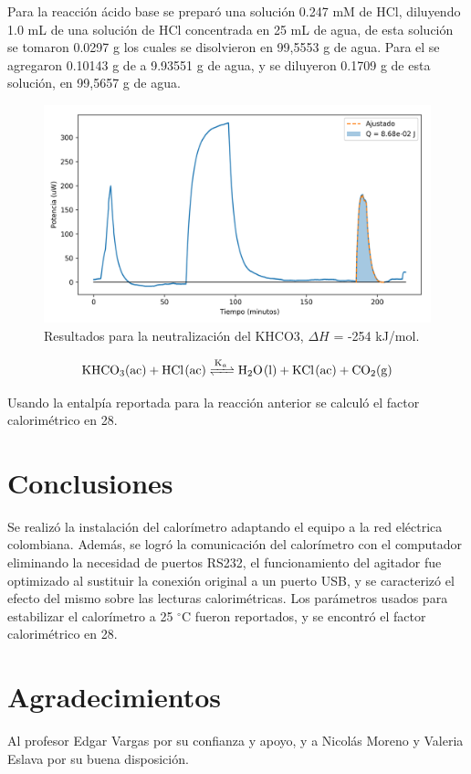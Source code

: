 \documentclass[a0]{sciposter}
\newcommand{\grad}{$^\circ$C}
\newcommand{\figwidth}{0.7\linewidth}
\begin{document}
\begin{multicols}{3}
	Para la reacci\'on \'acido base se prepar\'o una soluci\'on 0.247 mM de HCl, diluyendo 1.0 mL de una soluci\'on de HCl concentrada en 25 mL de agua, de esta soluci\'on se tomaron 0.0297 g los cuales se disolvieron en 99,5553 g de agua. Para el  se agregaron 0.10143 g de  a 9.93551 g de agua, y se diluyeron 0.1709 g de esta soluci\'on, en 99,5657 g de agua.

	\begin{figure}[h]
		\centering
		\includegraphics[width=\figwidth]{../Data/ChemicalCalibrations/HCl}
		\caption{Resultados para la neutralización del {KHCO3}, $\Delta H$ = -254 kJ/mol.}
	\end{figure}

	\begin{equation}
		\ce{KHCO3(ac) + HCl(ac) <=>[K_a] H2O(l) + KCl(ac) + CO2(g)}
	\end{equation}

	Usando la entalp\'ia reportada para la reacci\'on anterior se calcul\'o el factor calorim\'etrico en 28.
	
\section{Conclusiones}
	Se realiz\'o la instalaci\'on del calorímetro adaptando el equipo a la red eléctrica colombiana. Además, se logró la comunicaci\'on del calor\'imetro con el computador eliminando la necesidad de puertos RS232, el funcionamiento del agitador fue optimizado al sustituir la conexión original a un puerto USB, y se caracteriz\'o el efecto del mismo sobre las lecturas calorim\'etricas. Los parámetros usados para estabilizar el calorímetro a 25 \grad{} fueron reportados, y se encontró el factor calorimétrico en 28.

\printbibliography[heading=bibintoc, title={Referencias}]
\section*{Agradecimientos}
	Al profesor Edgar Vargas por su confianza y apoyo, y a Nicol\'as Moreno y Valeria Eslava por su buena disposici\'on.
\end{multicols}
\end{document}

